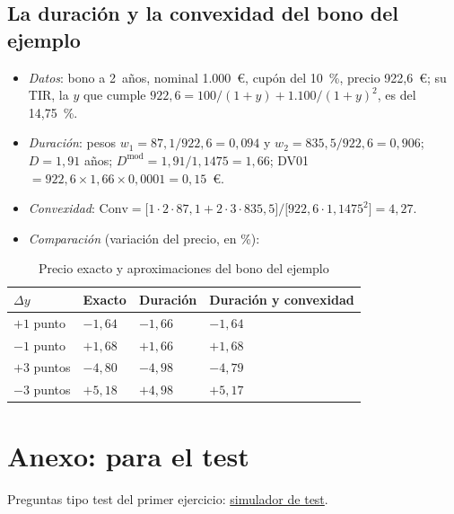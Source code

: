 \documentclass[11pt]{article}
\begin{document}
\begin{infografia}[H]
\centering
\caption{2 estrategias para invertir a 2~años}\label{figu:estrategias-expectativas}
\end{infografia}

\subsection{La duración y la convexidad del bono del ejemplo}

\begin{itemize}
\item \emph{Datos}: bono a 2~años, nominal 1.000~€, cupón del 10~\%, precio 922,6~€; su TIR, la $y$ que cumple $922{,}6=100/(1+y)+1.100/(1+y)^2$, es del 14,75~\%.
\item \emph{Duración}: pesos $w_1=87{,}1/922{,}6=0{,}094$ y $w_2=835{,}5/922{,}6=0{,}906$; $D=1{,}91$ años; $D^{\mathrm{mod}}=1{,}91/1{,}1475=1{,}66$; DV01 $=922{,}6\times1{,}66\times0{,}0001=0{,}15$~€.
\item \emph{Convexidad}: $\mathrm{Conv}=\big[1\cdot2\cdot87{,}1+2\cdot3\cdot835{,}5\big]/\big[922{,}6\cdot1{,}1475^2\big]=4{,}27$.
\item \emph{Comparación} (variación del precio, en \%):
\end{itemize}

\begin{table}[H]
\centering
\caption{Precio exacto y aproximaciones del bono del ejemplo}\label{tab:aproximaciones}
\small
\begin{tabular}{>{\centering\arraybackslash}m{2.6cm}>{\centering\arraybackslash}m{2.6cm}>{\centering\arraybackslash}m{2.6cm}>{\centering\arraybackslash}m{3.4cm}}
\toprule
\rowcolor{tceeazulpalido}\textbf{$\Delta y$} & \textbf{Exacto} & \textbf{Duración} & \textbf{Duración y convexidad}\\
\midrule
$+1$ punto & $-1{,}64$ & $-1{,}66$ & $-1{,}64$\\
$-1$ punto & $+1{,}68$ & $+1{,}66$ & $+1{,}68$\\
$+3$ puntos & $-4{,}80$ & $-4{,}98$ & $-4{,}79$\\
$-3$ puntos & $+5{,}18$ & $+4{,}98$ & $+5{,}17$\\
\bottomrule
\end{tabular}
\end{table}

\section{Anexo: para el test}\label{anexo:test}

\begin{anotaciones}
Preguntas tipo test del primer ejercicio: \href{https://www.victorgutierrezmarcos.es/oposicion/temario/primer-ejercicio/test/simulador.html?tema=3.B.24}{simulador de test}.
\end{anotaciones}

\bibliografia
\end{document}
